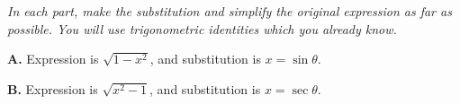 \emph{In each part, make the substitution and simplify the original expression as far as possible.  You will use trigonometric identities which you already know.}

\bigskip

\noindent \textbf{A.}  Expression is $\sqrt{1 - x^2}$, and substitution is $x=\sin\theta$.

\vspace{40mm}

\noindent \textbf{B.}  Expression is $\sqrt{x^2 - 1}$, and substitution is $x=\sec\theta$.

\vspace{40mm}
